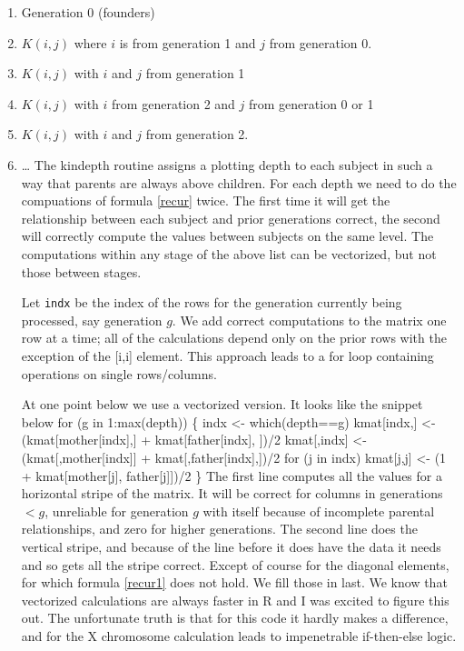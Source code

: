 \documentclass{article}
\begin{document}
\begin{enumerate}
  \item Generation 0 (founders)
  \item $K(i,j)$ where $i$ is from generation 1 and $j$ from generation 0.
  \item $K(i,j)$ with $i$ and $j$ from generation 1
  \item $K(i,j)$ with $i$ from generation 2 and $j$ from generation 0 or 1
  \item $K(i,j)$ with $i$ and $j$ from generation 2.
  \item \ldots
The kindepth routine assigns a plotting depth to each subject in such
a way that parents are always above children.  
For each depth we need to do the compuations of formula \eqref{recur}
twice.  The first time it will get the relationship between each subject
and prior generations correct, the second will correctly compute the
values between subjects on the same level.
The computations within any stage of the above list can be vectorized,
but not those between stages.

Let {\tt{}indx} be the index of the
rows for the generation currently being processed, say generation $g$.  
We add correct computations to the matrix one row at a time;
all of the calculations depend only on the prior rows with the
exception of the [i,i] element.
This approach leads to
a for loop containing operations on single rows/columns.  

At one point below we use a vectorized version. It looks like the snippet below
\nwenddocs{}\endmoddef
for (g in 1:max(depth)) \{
    indx <- which(depth==g)
    kmat[indx,] <- (kmat[mother[indx],] + kmat[father[indx], ])/2
    kmat[,indx] <- (kmat[,mother[indx]] + kmat[,father[indx],])/2
    for (j in indx) kmat[j,j] <- (1 + kmat[mother[j], father[j]])/2
\}
\nwendcode{}\nwdocspar
The first line computes all the values for a horizontal stripe of the
matrix. It will be correct for columns in generations $<g$, unreliable
for generation $g$ with itself because of incomplete parental relationships,
and zero for higher generations.
The second line does the vertical stripe, and because of the line before it
does have the data it needs and so gets all the stripe correct.
Except of course for the diagonal elements, for which formula \eqref{recur1}
does not hold.  We fill those in last.
We know that vectorized calculations are always faster in R and I was excited
to figure this out.  The unfortunate truth is that for this code
it hardly makes a difference, and for the X chromosome calculation leads to
impenetrable if-then-else logic.


\end{enumerate}
\end{document}

